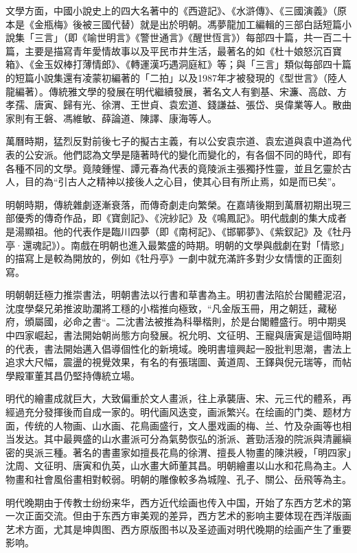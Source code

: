 文學方面，中國小說史上的四大名著中的《西遊記》、《水滸傳》、《三國演義》（原本是《金瓶梅》後被三國代替）就是出於明朝。馮夢龍加工編輯的三部白話短篇小說集「三言」（即《喻世明言》《警世通言》《醒世恆言》）每部四十篇，共一百二十篇，主要是描寫青年愛情故事以及平民市井生活，最著名的如《杜十娘怒沉百寶箱》、《金玉奴棒打薄情郎》、《轉運漢巧遇洞庭紅》等；與「三言」類似每部四十篇的短篇小說集還有凌蒙初編著的「二拍」以及1987年才被發現的《型世言》（陸人龍編著）。傳統雅文學的發展在明代繼續發展，著名文人有劉基、宋濂、高啟、方孝孺、唐寅、歸有光、徐渭、王世貞、袁宏道、錢謙益、張岱、吳偉業等人。散曲家則有王磐、馮維敏、薛論道、陳譯、康海等人。

萬曆時期，猛烈反對前後七子的擬古主義，有以公安袁宗道、袁宏道與袁中道為代表的公安派。他們認為文學是隨著時代的變化而變化的，有各個不同的時代，即有各種不同的文學。竟陵鍾惺、譚元春為代表的竟陵派主張獨抒性靈，並且乞靈於古人，目的為“引古人之精神以接後人之心目，使其心目有所止焉，如是而已矣”。

明朝時期，傳統雜劇逐漸衰落，而傳奇劇走向繁榮。在嘉靖後期到萬曆初期出現三部優秀的傳奇作品，即《寶劍記》、《浣紗記》及《鳴鳳記》。明代戲劇的集大成者是湯顯祖。他的代表作是臨川四夢（即《南柯記》、《邯鄲夢》、《紫釵記》及《牡丹亭·還魂記》）。南戲在明朝也進入最繁盛的時期。明朝的文學與戲劇在對「情慾」的描寫上是較為開放的，例如《牡丹亭》一劇中就充滿許多對少女情懷的正面刻寫。

明朝朝廷極力推崇書法，明朝書法以行書和草書為主。明初書法陷於台閣體泥沼，沈度學粲兄弟推波助瀾將工穩的小楷推向極致，“凡金版玉冊，用之朝廷，藏秘府，頒屬國，必命之書“。二沈書法被推為科舉楷則，於是台閣體盛行。明中期吳中四家崛起，書法開始朝尚態方向發展。祝允明、文征明、王寵與唐寅是這個時期的代表，書法開始邁入倡導個性化的新境域。晚明書壇興起一股批判思潮，書法上追求大尺幅，震盪的視覺效果，有名的有張瑞圖、黃道周、王鐸與倪元瑞等，而帖學殿軍董其昌仍堅持傳統立場。

明代的繪畫成就巨大，大致偏重於文人畫派，往上承襲唐、宋、元三代的體系，再經過充分發揮後而自成一家的。明代画风迭变，画派繁兴。在绘画的门类、题材方面，传统的人物画、山水画、花鳥画盛行，文人墨戏画的梅、兰、竹及杂画等也相当发达。其中最興盛的山水畫派可分為氣勢恢弘的浙派、蒼勁活潑的院派與清麗縝密的吳派三種。著名的書畫家如擅長花鳥的徐渭、擅長人物畫的陳洪綬，「明四家」沈周、文征明、唐寅和仇英，山水畫大師董其昌。明朝繪畫以山水和花鳥為主。人物畫和社會風俗畫相對較弱。明朝的雕像較多為城隍、孔子、關公、岳飛等為主。

明代晚期由于传教士纷纷来华，西方近代绘画也传入中国，开始了东西方艺术的第一次正面交流。但由于东西方审美观的差异，西方艺术的影响主要体现在西洋版画艺术方面，尤其是坤舆图、西方原版图书以及圣迹画对明代晚期的绘画产生了重要影响。

